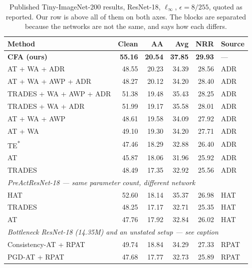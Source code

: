 \begin{table}[!htbp]
  \centering \small \setlength{\tabcolsep}{4.5pt}
  \caption{Published Tiny-ImageNet-200 results, ResNet-18, $\ell_\infty$, $\epsilon = 8/255$, quoted as
  reported. Our row is above all of them on both axes. The blocks are separated because the networks
  are not the same, and  says how each differs.}
  \label{tab:published_tin}
  \begin{tabular}{lrrrrl}
    \toprule
    Method & Clean & AA & Avg & NRR & Source \\
    \midrule
    \textbf{CFA (ours)}        & \textbf{55.16} & \textbf{20.54} & \textbf{37.85} & \textbf{29.93} & --- \\
    \midrule
    AT + WA + ADR              & 48.55 & 20.23 & 34.39 & 28.56 & ADR \\
    AT + WA + AWP + ADR        & 48.27 & 20.12 & 34.20 & 28.40 & ADR \\
    TRADES + WA + AWP + ADR    & 51.38 & 19.48 & 35.43 & 28.25 & ADR \\
    TRADES + WA + ADR          & 51.99 & 19.17 & 35.58 & 28.01 & ADR \\
    AT + WA + AWP              & 48.61 & 19.58 & 34.09 & 27.92 & ADR \\
    AT + WA                    & 49.10 & 19.30 & 34.20 & 27.71 & ADR \\
    TE\textsuperscript{*}      & 47.46 & 18.29 & 32.88 & 26.40 & ADR \\
    AT                         & 45.87 & 18.06 & 31.96 & 25.92 & ADR \\
    TRADES                     & 48.49 & 17.35 & 32.92 & 25.56 & ADR \\
    \midrule
    \multicolumn{6}{l}{\emph{PreActResNet-18 --- same parameter count, different network}} \\
    HAT                        & 52.60 & 18.14 & 35.37 & 26.98 & HAT \\
    TRADES                     & 48.25 & 17.17 & 32.71 & 25.35 & HAT \\
    AT                         & 47.76 & 17.92 & 32.84 & 26.02 & HAT \\
    \midrule
    \multicolumn{6}{l}{\emph{Bottleneck ResNet-18 (14.35M) and an unstated setup --- see caption}} \\
    Consistency-AT + RPAT      & 49.74 & 18.84 & 34.29 & 27.33 & RPAT \\
    PGD-AT + RPAT              & 47.68 & 17.77 & 32.73 & 25.89 & RPAT \\

\end{tabular}
\end{table}
